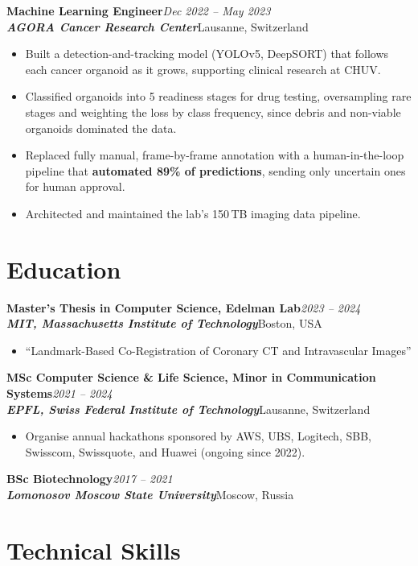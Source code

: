 \documentclass[11pt,a4paper]{article}
\newcommand{\role}[4]{%
  \needspace{5\baselineskip}%
  \noindent\textbf{#1}\hfill\textit{#2}\\
  \textbf{\textit{#3}}\hfill\textcolor{subtle}{#4}\par\vspace{2pt}%
}
\begin{document}
\role{Machine Learning Engineer}{Dec 2022 -- May 2023}{AGORA Cancer Research Center}{Lausanne, Switzerland}
\begin{itemize}
  \item Built a detection-and-tracking model (YOLOv5, DeepSORT) that follows each cancer organoid as it grows, supporting clinical research at CHUV.
  \item Classified organoids into 5 readiness stages for drug testing, oversampling rare stages and weighting the loss by class frequency, since debris and non-viable organoids dominated the data.
  \item Replaced fully manual, frame-by-frame annotation with a human-in-the-loop pipeline that \textbf{automated 89\% of predictions}, sending only uncertain ones for human approval.
  \item Architected and maintained the lab's 150\,TB imaging data pipeline.
\end{itemize}

\section{Education}

\role{Master's Thesis in Computer Science, Edelman Lab}{2023 -- 2024}{MIT, Massachusetts Institute of Technology}{Boston, USA}
\vspace{-2pt}
\begin{itemize}
  \item ``Landmark-Based Co-Registration of Coronary CT and Intravascular Images''
\end{itemize}

\role{MSc Computer Science \& Life Science, Minor in Communication Systems}{2021 -- 2024}{EPFL, Swiss Federal Institute of Technology}{Lausanne, Switzerland}
\vspace{-2pt}
\begin{itemize}
  \item Organise annual hackathons sponsored by AWS, UBS, Logitech, SBB, Swisscom, Swissquote, and Huawei (ongoing since 2022).
\end{itemize}

\role{BSc Biotechnology}{2017 -- 2021}{Lomonosov Moscow State University}{Moscow, Russia}

\section{Technical Skills}
\end{document}
